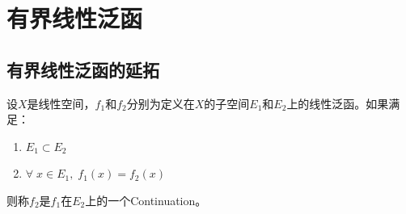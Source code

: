 \section{有界线性泛函}

\subsection{有界线性泛函的延拓}
\begin{definition}
	设$X$是线性空间，$f_1$和$f_2$分别为定义在$X$的子空间$E_1$和$E_2$上的线性泛函。如果满足：
	\begin{enumerate}
		\item $E_1\subset E_2$
		\item $\forall\;x\in E_1,\;f_1(x)=f_2(x)$
	\end{enumerate}
	则称$f_2$是$f_1$在$E_2$上的一个\gls{Continuation}。
\end{definition}

